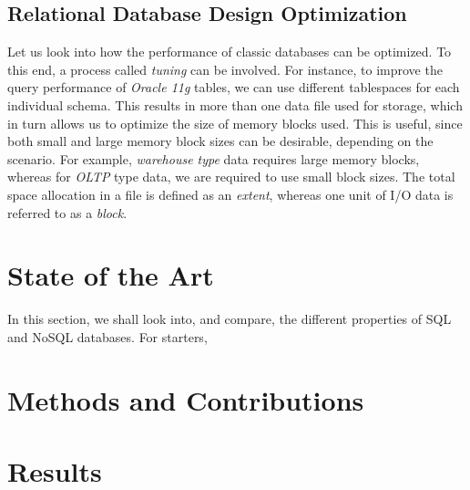 \documentclass[10pt,        %
               a4paper,     %
               journal,     %
               ]{IEEEtran}
\begin{document}
\subsection{Relational Database Design Optimization}
Let us look into how the performance of classic databases can be optimized. To this end, a process called \textit{tuning} can be involved. For instance, to improve the query performance of \textit{Oracle 11g} tables, we can use different tablespaces for each individual schema.  This results in more than one data file used for storage, which in turn allows us to optimize the size of memory blocks used. This is useful, since both small and large memory block sizes can be desirable, depending on the scenario. For example, \textit{warehouse type} data requires large memory blocks, whereas for \textit{OLTP} type data, we are required to use small block sizes. The total space allocation in a file is defined as an \textit{extent}, whereas one unit of I/O data is referred to as a \textit{block}. 
\section{State of the Art}
In this section, we shall look into, and compare, the different properties of SQL and NoSQL databases. For starters, 
\section{Methods and Contributions}
\section{Results}

%
%
\end{document}
